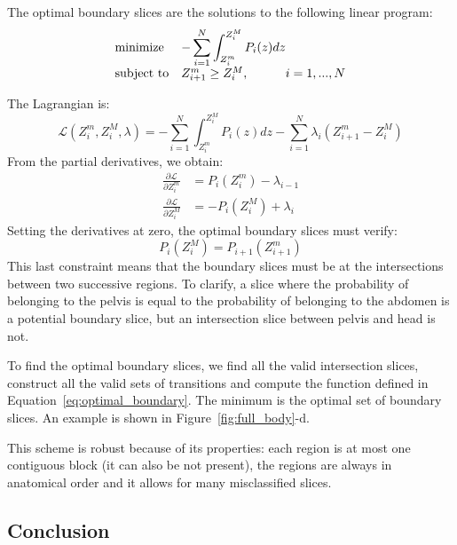 The optimal boundary slices are the solutions to the following linear program:
\begin{equation}
    \begin{array}{ll@{}ll}
    \text{minimize}  & - \displaystyle\sum\limits_{i=1}^{N} \int_{Z_i^m}^{Z_i^M} P_i(z) dz &\\
    \text{subject to}&  Z^m_{i+1} \ge Z^M_i,  &i=1 ,..., N
    \end{array}
    \label{eq:optimal_boundary}
\end{equation}

The Lagrangian is:
\begin{equation}
    \mathcal{L} \left( Z_i^m, Z_i^M, \lambda \right) = - \displaystyle\sum\limits_{i=1}^{N} \int_{Z_i^m}^{Z_i^M} P_i(z) dz
                                                        - \displaystyle\sum\limits_{i=1}^{N} \lambda_i \left( Z^m_{i+1} - Z_i^M \right)
\end{equation}
From the partial derivatives, we obtain:
\begin{align*}
    \frac{\partial \mathcal{L}}{\partial Z_i^m} &= P_i \left( Z_i^m \right) - \lambda_{i-1} \\
    \frac{\partial \mathcal{L}}{\partial Z_i^M} &= - P_i \left( Z_i^M \right) + \lambda_{i}
\end{align*}
Setting the derivatives at zero, the optimal boundary slices must verify:
\begin{equation}
    P_i \left( Z_i^M \right) = P_{i+1} \left( Z_{i+1}^m \right)
\end{equation}
This last constraint means that the boundary slices must be at the intersections between two successive regions. To clarify, a slice where the probability of belonging to the pelvis is equal to the probability of belonging to the abdomen is a potential boundary slice, but an intersection slice between pelvis and head is not.

To find the optimal boundary slices, we find all the valid intersection slices, construct all the valid sets of transitions and compute the function defined in Equation~\ref{eq:optimal_boundary}. The minimum is the optimal set of boundary slices. An example is shown in Figure~\ref{fig:full_body}-d.

This scheme is robust because of its properties: each region is at most one contiguous block (it can also be not present), the regions are always in anatomical order and it allows for many misclassified slices. 

\subsection{Conclusion}

